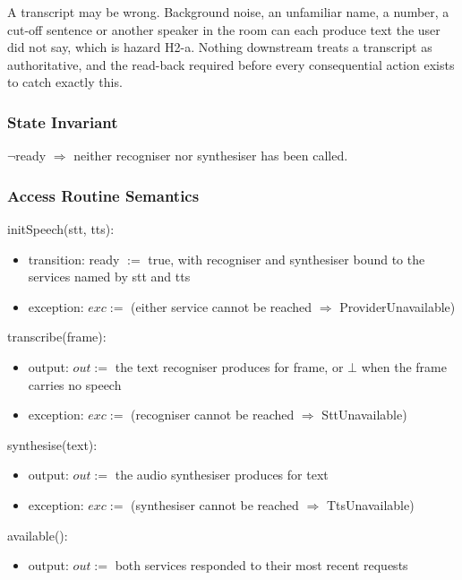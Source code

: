 \documentclass[12pt, titlepage]{article}
\newcommand{\nil}{\bot}
\begin{document}
\noindent A transcript may be wrong. Background noise, an unfamiliar name, a
number, a cut-off sentence or another speaker in the room can each produce text
the user did not say, which is hazard H2-a. Nothing downstream treats a
transcript as authoritative, and the read-back required before every
consequential action exists to catch exactly this.

\subsubsection{State Invariant}

$\lnot$ready $\Rightarrow$ neither recogniser nor synthesiser has been called.

\subsubsection{Access Routine Semantics}

\noindent initSpeech(stt, tts):
\begin{itemize}
\item transition: ready $:=$ true, with recogniser and synthesiser bound to the
services named by stt and tts
\item exception: $exc :=$ (either service cannot be reached $\Rightarrow$
ProviderUnavailable)
\end{itemize}

\noindent transcribe(frame):
\begin{itemize}
\item output: $out :=$ the text recogniser produces for frame, or $\nil$ when
the frame carries no speech
\item exception: $exc :=$ (recogniser cannot be reached $\Rightarrow$
SttUnavailable)
\end{itemize}

\noindent synthesise(text):
\begin{itemize}
\item output: $out :=$ the audio synthesiser produces for text
\item exception: $exc :=$ (synthesiser cannot be reached $\Rightarrow$
TtsUnavailable)
\end{itemize}

\noindent available():
\begin{itemize}
\item output: $out :=$ both services responded to their most recent requests
\end{itemize}
\end{document}
